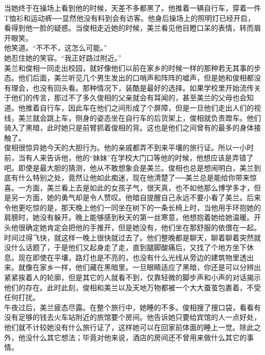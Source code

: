 \begin{multicols}{\theparacolNo}
当她终于在操场上看到他的时候，天差不多都黑了。他推着一辆自行车，穿着一件T恤衫和运动裤──显然他没有料到会有访客。他身后操场上的照明灯已经开启，看得到他一脸的疑惑。当俊相走近她的时候，美兰看见他目瞪口呆的表情，转而眉开眼笑。\\

他笑道。“不不不，这怎么可能。”\\

她忍住她的笑容。“我正好路过附近。”\\

美兰和俊相一同走出校园，就好像他们以前在家乡的时候一样的那种若无其事的步态。他们后面，美兰听见几个男生发出的口哨声和阵阵的嘘声，但是她和俊相都没有理会，也没有回头看。那种情况下，装酷是最好的选择。如果学校里开始流传关于他们的传言，那过不了多久俊相的父亲就会有耳闻的，甚至美兰的父母也会知道。他推着自行车，因此车在他们之间形成了个屏障，但是一旦他们走出人们的视线，美兰就会跳上车，侧身的姿态坐在自行车的后货架上，俊相就负责蹬车。他们骑入了黑暗，此时她只是前臂抓着俊相的背。这也是他们之间曾有的最多的身体接触了。\\

俊相很惊异她今天的大胆行为。他的亲戚都弄不到来平壤的旅行证。所以一小时前，当有人来告诉他，他的“妹妹”在学校大门口等他的时候，他想应该是弄错了吧。即使是最大胆的猜测，他从不敢想象会是美兰。俊相也总是想闹明白，美兰到底有什么特别之处，竟然让他如此痴迷，现在他清楚了──美兰总是能给你带来惊喜。一方面，美兰看上去是如此的女孩子气，很天真，也不如他那么博学多才，但是另一方面，她的勇气却是令人赞叹。他暗自提醒自己永远不要小看了美兰。后来令他更吃惊的是，那天晚上他们一同坐在树下的一条长椅上时，当他用手环抱她的肩膀时，她没有躲开。晚上能够感到秋天的第一丝寒意，他想抱着她给她温暖。开头他很确定她肯定会把他的手推开，但是她没有，他们坐在那舒服的依偎在一起。\\

时间过得飞快，就这样一晚上很快就过去了。他们整晚都是聊天，聊着聊着突然就没什么话题了，于是他们又起身走了走，直到腿脚酸痛后，又找了个地方坐下休息。现在即使在平壤，路灯也是不亮的，也没有什么光线从旁边的建筑物里透出来。就像在家乡一样，他们藏在黑暗里。一旦眼睛适应了黑暗，你还是可以分辨出紧紧挨着人的轮廓，但是其它的人就看不到，仅靠轻微的脚步声和小声的对话揭示他们的存在。此时此刻，俊相和美兰以及天地万物都被一个大大蚕茧包裹着，不受任何打扰。\\

午夜过后，美兰疲态尽露。在整个旅行中，她睡的不多。俊相搜了搜口袋，看看有没有足够的钱去火车站附近的旅馆要个房间。他告诉她只要给宾馆的人一点好处，他们就不计较她没有什么旅行证了，这样她可以在回家前体面的睡上一觉。除此之外，他没什么其它想法；毕竟对他来说，酒店的房间还不曾用来做什么其它的事情。\\


\end{multicols}
